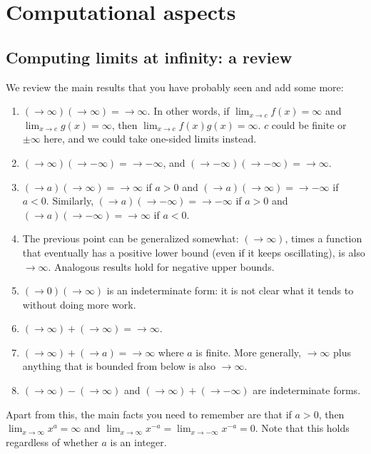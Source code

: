 \documentclass[10pt]{amsart}
\begin{document}
\section{Computational aspects}

\subsection{Computing limits at infinity: a review}

We review the main results that you have probably seen and add some
more:

\begin{enumerate}
\item $(\to \infty)(\to \infty) = \to \infty$. In other words, if
  $\lim_{x \to c} f(x) = \infty$ and $\lim_{x \to c} g(x) = \infty$,
  then $\lim_{x \to c} f(x)g(x) = \infty$. $c$ could be finite or $\pm
  \infty$ here, and we could take one-sided limits instead.
\item $(\to \infty)(\to -\infty) = \to -\infty$, and $(\to
  -\infty)(\to -\infty) = \to \infty$.
\item $(\to a)(\to \infty) = \to \infty$ if $a > 0$ and $(\to a)(\to
  \infty) = \to -\infty$ if $a < 0$. Similarly, $(\to a)(\to -\infty) =
  \to -\infty$ if $a > 0$ and $(\to a)(\to -\infty) = \to \infty$ if
  $a < 0$.
\item The previous point can be generalized somewhat: $(\to \infty)$,
  times a function that eventually has a positive lower bound (even if
  it keeps oscillating), is also $\to \infty$. Analogous results hold
  for negative upper bounds.
\item $(\to 0)(\to \infty)$ is an indeterminate form: it is not clear
  what it tends to without doing more work.
\item $(\to \infty) + (\to \infty) = \to \infty$.
\item $(\to \infty) + (\to a) = \to \infty$ where $a$ is finite. More
  generally, $\to \infty$ plus anything that is bounded from below is
  also $\to \infty$.
\item $(\to \infty) - (\to \infty)$ and $(\to \infty) + (\to -\infty)$
  are indeterminate forms.
\end{enumerate}

Apart from this, the main facts you need to remember are that if
$a > 0$, then $\lim_{x \to \infty} x^a = \infty$ and $\lim_{x \to
\infty} x^{-a} = \lim_{x \to -\infty} x^{-a} = 0$. Note that this
holds regardless of whether $a$ is an integer.
\end{document}
